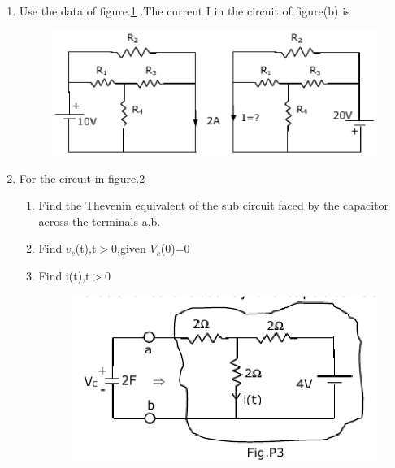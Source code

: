 \documentclass[journal,12pt,twocolumn]{IEEEtran}
\begin{document}
\begin{enumerate}
\item Use the data of figure.\ref{fig32} .The current I in the circuit of figure(b) is
\begin{enumerate}
\setlength\itemsep{2em}
\begin{figure}[!h]
\begin{center}
\includegraphics[scale=0.5]{./figs/fig32.eps}
\caption{}
\label{fig32}
\end{center}
\end{figure}
\end{enumerate}

\item For the circuit in figure.\ref{fig33}
\begin{enumerate}
\setlength\itemsep{2em}
\item Find the Thevenin equivalent of the sub circuit faced by the capacitor across
the terminals a,b.
\item Find $v_{c}$(t),t$>$0,given $V_{c}$(0)=0
\item Find i(t),t$>$0
\begin{figure}[!h]
\begin{center}
\includegraphics[scale=0.5]{./figs/fig33.eps}
\caption{}
\label{fig33}
\end{center}
\end{figure}
\end{enumerate}


\end{enumerate}
\end{document}
